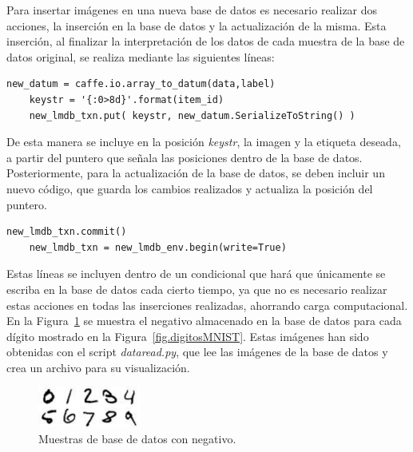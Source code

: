 Para insertar imágenes en una nueva base de datos es necesario realizar dos acciones, la inserción en la base de datos y la actualización de la misma. Esta inserción, al finalizar la interpretación de los datos de cada muestra de la base de datos original, se realiza mediante las siguientes líneas:
\vspace{10pt}
\begin{lstlisting}[frame=single]
	new_datum = caffe.io.array_to_datum(data,label)
	keystr = '{:0>8d}'.format(item_id)
	new_lmdb_txn.put( keystr, new_datum.SerializeToString() )
\end{lstlisting}

De esta manera se incluye en la posición \textit{keystr}, la imagen y la etiqueta deseada, a partir del puntero que señala las posiciones dentro de la base de datos.\\

Posteriormente, para la actualización de la base de datos, se deben incluir un nuevo código, que guarda los cambios realizados y actualiza la posición del puntero.
\vspace{10pt}
\begin{lstlisting}[frame=single]
	new_lmdb_txn.commit()
	new_lmdb_txn = new_lmdb_env.begin(write=True)
\end{lstlisting}

Estas líneas se incluyen dentro de un condicional que hará que únicamente se escriba en la base de datos cada cierto tiempo, ya que no es necesario realizar estas acciones en todas las inserciones realizadas, ahorrando carga computacional.\\

En la Figura~\ref{fig.neg} se muestra el negativo almacenado en la base de datos para cada dígito mostrado en la Figura~\ref{fig.digitosMNIST}. Estas imágenes han sido obtenidas con el script \textit{dataread.py}, que lee las imágenes de la base de datos y crea un archivo para su visualización.\\

\begin{figure}[H]
	\begin{center}
		\includegraphics[width=0.3\textwidth]{figures/negativo}
		\caption{Muestras de base de datos con negativo.}
		\label{fig.neg}
	\end{center}
\end{figure}

